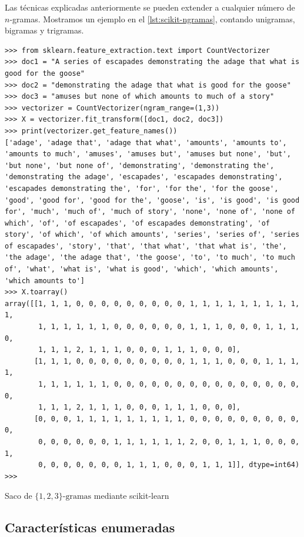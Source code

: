 Las técnicas explicadas anteriormente se pueden extender a cualquier número de $n$-gramas. Mostramos un ejemplo en el \autoref{lst:scikit-ngramas}, contando unigramas, bigramas y trigramas.

\begin{listing}[htbp]
\begin{verbatim}
>>> from sklearn.feature_extraction.text import CountVectorizer
>>> doc1 = "A series of escapades demonstrating the adage that what is good for the goose"
>>> doc2 = "demonstrating the adage that what is good for the goose"
>>> doc3 = "amuses but none of which amounts to much of a story"
>>> vectorizer = CountVectorizer(ngram_range=(1,3))
>>> X = vectorizer.fit_transform([doc1, doc2, doc3])
>>> print(vectorizer.get_feature_names())
['adage', 'adage that', 'adage that what', 'amounts', 'amounts to', 'amounts to much', 'amuses', 'amuses but', 'amuses but none', 'but', 'but none', 'but none of', 'demonstrating', 'demonstrating the', 'demonstrating the adage', 'escapades', 'escapades demonstrating', 'escapades demonstrating the', 'for', 'for the', 'for the goose', 'good', 'good for', 'good for the', 'goose', 'is', 'is good', 'is good for', 'much', 'much of', 'much of story', 'none', 'none of', 'none of which', 'of', 'of escapades', 'of escapades demonstrating', 'of story', 'of which', 'of which amounts', 'series', 'series of', 'series of escapades', 'story', 'that', 'that what', 'that what is', 'the', 'the adage', 'the adage that', 'the goose', 'to', 'to much', 'to much of', 'what', 'what is', 'what is good', 'which', 'which amounts', 'which amounts to']
>>> X.toarray()
array([[1, 1, 1, 0, 0, 0, 0, 0, 0, 0, 0, 0, 1, 1, 1, 1, 1, 1, 1, 1, 1, 1,
        1, 1, 1, 1, 1, 1, 0, 0, 0, 0, 0, 0, 1, 1, 1, 0, 0, 0, 1, 1, 1, 0,
        1, 1, 1, 2, 1, 1, 1, 0, 0, 0, 1, 1, 1, 0, 0, 0],
       [1, 1, 1, 0, 0, 0, 0, 0, 0, 0, 0, 0, 1, 1, 1, 0, 0, 0, 1, 1, 1, 1,
        1, 1, 1, 1, 1, 1, 0, 0, 0, 0, 0, 0, 0, 0, 0, 0, 0, 0, 0, 0, 0, 0,
        1, 1, 1, 2, 1, 1, 1, 0, 0, 0, 1, 1, 1, 0, 0, 0],
       [0, 0, 0, 1, 1, 1, 1, 1, 1, 1, 1, 1, 0, 0, 0, 0, 0, 0, 0, 0, 0, 0,
        0, 0, 0, 0, 0, 0, 1, 1, 1, 1, 1, 1, 2, 0, 0, 1, 1, 1, 0, 0, 0, 1,
        0, 0, 0, 0, 0, 0, 0, 1, 1, 1, 0, 0, 0, 1, 1, 1]], dtype=int64)
>>> 
\end{verbatim}
\caption{Saco de $\{1,2,3\}\text{-gramas}$ mediante scikit-learn}
\label{lst:scikit-ngramas}
\end{listing}


\FloatBarrier
\subsection{Características enumeradas}

